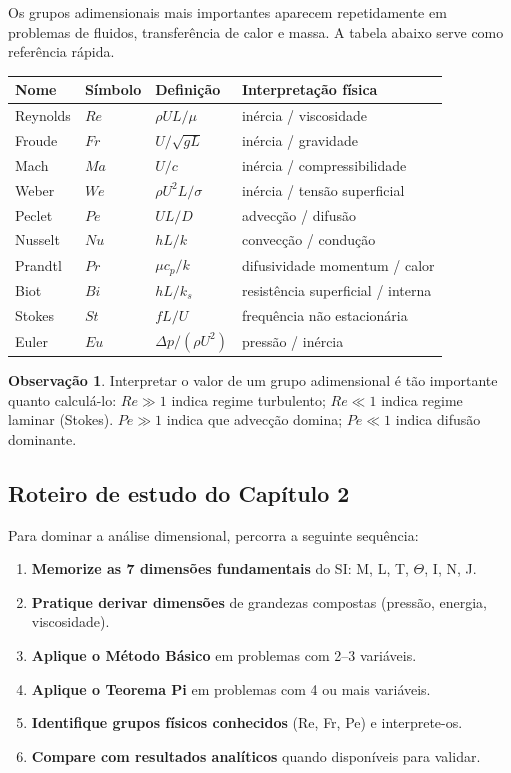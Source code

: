 \documentclass[12pt,a4paper,oneside]{book}
\theoremstyle{definition}
\newtheorem{remark}[definition]{Observação}
\begin{document}
Os grupos adimensionais mais importantes aparecem repetidamente em problemas de fluidos,
transferência de calor e massa. A tabela abaixo serve como referência rápida.

\begin{center}
\begin{tabular}{llll}
\toprule
\textbf{Nome} & \textbf{Símbolo} & \textbf{Definição} & \textbf{Interpretação física} \\
\midrule
Reynolds    & $Re$ & $\rho U L/\mu$   & inércia / viscosidade \\
Froude      & $Fr$ & $U/\sqrt{gL}$    & inércia / gravidade \\
Mach        & $Ma$ & $U/c$            & inércia / compressibilidade \\
Weber       & $We$ & $\rho U^2 L/\sigma$ & inércia / tensão superficial \\
Peclet      & $Pe$ & $U L/D$          & advecção / difusão \\
Nusselt     & $Nu$ & $hL/k$           & convecção / condução \\
Prandtl     & $Pr$ & $\mu c_p/k$      & difusividade momentum / calor \\
Biot        & $Bi$ & $hL/k_s$         & resistência superficial / interna \\
Stokes      & $St$ & $f L/U$          & frequência não estacionária \\
Euler       & $Eu$ & $\Delta p/(\rho U^2)$ & pressão / inércia \\
\bottomrule
\end{tabular}
\end{center}

\begin{remark}
Interpretar o valor de um grupo adimensional é tão importante quanto calculá-lo:
$Re \gg 1$ indica regime turbulento; $Re \ll 1$ indica regime laminar (Stokes).
$Pe \gg 1$ indica que advecção domina; $Pe \ll 1$ indica difusão dominante.
\end{remark}

\subsection{Roteiro de estudo do Capítulo 2}

Para dominar a análise dimensional, percorra a seguinte sequência:

\begin{enumerate}
    \item \textbf{Memorize as 7 dimensões fundamentais} do SI: M, L, T, $\Theta$, I, N, J.
    \item \textbf{Pratique derivar dimensões} de grandezas compostas (pressão, energia, viscosidade).
    \item \textbf{Aplique o Método Básico} em problemas com 2--3 variáveis.
    \item \textbf{Aplique o Teorema Pi} em problemas com 4 ou mais variáveis.
    \item \textbf{Identifique grupos físicos conhecidos} (Re, Fr, Pe) e interprete-os.
    \item \textbf{Compare com resultados analíticos} quando disponíveis para validar.
\end{enumerate}
\end{document}
